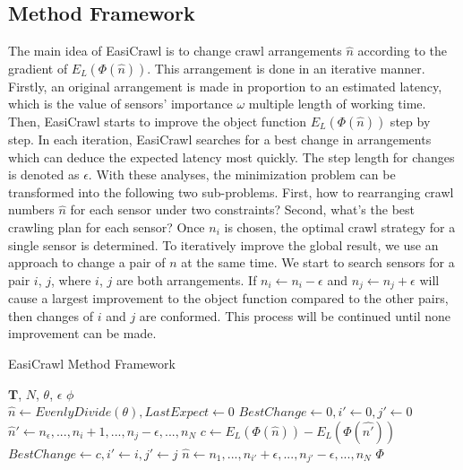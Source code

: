 \documentclass[conference]{IEEEtran}
\begin{document}
\subsection{Method Framework}
The main idea of EasiCrawl is to change crawl arrangements $\hat{n}$ according to the gradient of $E_L(\Phi(\hat{n}))$.
This arrangement is done in an iterative manner.
Firstly, an original arrangement is made in proportion to an estimated latency, which is the value of sensors' importance $\omega$ multiple length of working time.
Then, EasiCrawl starts to improve the object function $E_L(\Phi(\hat{n}))$ step by step. 
In each iteration, EasiCrawl searches for a best change in arrangements which can deduce the expected latency most quickly.
The step length for changes is denoted as $\epsilon$.
With these analyses, the minimization problem can be transformed into the following two sub-problems.
First, how to rearranging crawl numbers $\hat{n}$ for each sensor under two constraints? 
Second, what's the best crawling plan for each sensor? 
Once $n_i$ is chosen, the optimal crawl strategy for a single sensor is determined. 
To iteratively improve the global result, we use an approach to change a pair of $n$ at the same time.
We start to search sensors for a pair $i$, $j$, where $i$, $j$ are both arrangements. 
If $n_i\gets n_i-\epsilon$ and $n_j\gets n_j+\epsilon$ will cause a largest improvement to the object function compared to the other pairs, then changes of $i$ and $j$ are conformed. 
This process will be continued until none improvement can be made. 

\begin{algorithm}
	\caption{EasiCrawl Method Framework}
	\label{alg:framework}
	\begin{algorithmic}[1]
		\renewcommand{\algorithmicrequire}{\textbf{Input:}}
		\renewcommand{\algorithmicensure}{\textbf{Output:}}
		\REQUIRE $\mathbf{T}$, $N$, $\theta$, $\epsilon$
		\ENSURE  $\phi$
		\\ 
		\STATE $\hat{n}\gets EvenlyDivide(\theta), LastExpect\gets 0$
		\STATE $BestChange \gets 0, i'\gets 0, j'\gets 0$		
		\STATE $\hat{n}'\gets n_\epsilon,...,n_i+1,...,n_j-\epsilon,...,n_N$
		\STATE $c\gets E_L(\Phi(\hat{n})) - E_L(\Phi(\hat{n'}))$
		\STATE $BestChange \gets c, i'\gets i, j'\gets j$
		\ENDIF
		\ENDFOR
		\STATE $\hat{n}\gets n_1,...,n_{i'}+\epsilon,...,n_{j'}-\epsilon,...,n_N$
		\ENDWHILE 
		\RETURN $\Phi$
	\end{algorithmic} 
\end{algorithm}
\end{document}
